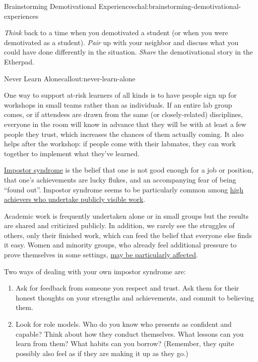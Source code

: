 \begin{challenge}{Brainstorming Demotivational Experiences}{chal:brainstorming-demotivational-experiences}

\emph{Think} back to a time when you demotivated a student (or when you
were demotivated as a student). \emph{Pair} up with your neighbor and
discuss what you could have done differently in the situation.
\emph{Share} the demotivational story in the Etherpad.
\end{challenge}

\begin{callout}{Never Learn Alone}{callout:never-learn-alone}

One way to support at-risk learners of all kinds is to have people sign
up for workshops in small teams rather than as individuals. If an entire
lab group comes, or if attendees are drawn from the same (or
closely-related) disciplines, everyone in the room will know in advance
that they will be with at least a few people they trust, which increases
the chances of them actually coming. It also helps after the workshop:
if people come with their labmates, they can work together to implement
what they've learned.
\end{callout}


\href{https://en.wikipedia.org/wiki/Impostor\_syndrome}{Impostor
syndrome} is the belief that one is not good enough for a job or
position, that one's achievements are lucky flukes, and an accompanying
fear of being ``found out''. Impostor syndrome seems to be particularly
common among
\href{https://www.usenix.org/blog/impostor-syndrome-proof-yourself-and-your-community}{high
achievers who undertake publicly visible work}.

Academic work is frequently undertaken alone or in small groups but the
results are shared and criticized publicly. In addition, we rarely see
the struggles of others, only their finished work, which can feed the
belief that everyone else finds it easy. Women and minority groups, who
already feel additional pressure to prove themselves in some settings,
\href{http://www.paulineroseclance.com/pdf/ip\_high\_achieving\_women.pdf}{may
be particularly affected}.

Two ways of dealing with your own impostor syndrome are:

\begin{enumerate}
\item
  Ask for feedback from someone you respect and trust. Ask them for
  their honest thoughts on your strengths and achievements, and commit
  to believing them.
\item
  Look for role models. Who do you know who presents as confident and
  capable? Think about how they conduct themselves. What lessons can you
  learn from them? What habits can you borrow? (Remember, they quite
  possibly also feel as if they are making it up as they go.)
\end{enumerate}

